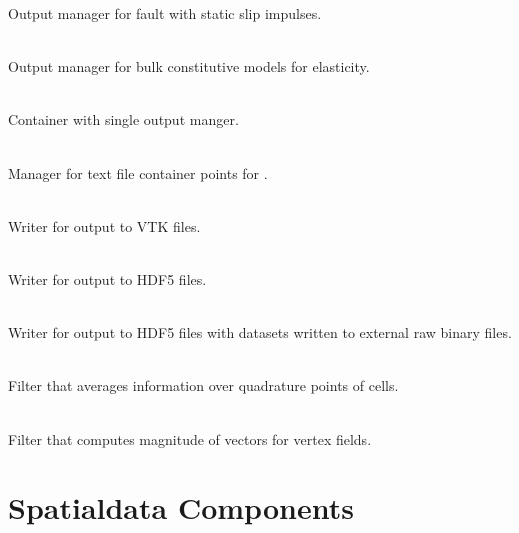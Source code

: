 \begin{description}
Output manager for fault with static slip impulses.
\item [\object{OutputMatElastic}] \\
Output manager for bulk constitutive models for elasticity.
\item [\object{SingleOutput}] \\
Container with single output manger.
\item [\object{PointsList}] \\
Manager for text file container points for .
\item [\object{DataWriterVTK}] \\
Writer for output to VTK files.
\item [\object{DataWriterHDF5}] \\
Writer for output to HDF5 files.
\item [\object{DataWriterHDF5Ext}] \\
Writer for output to HDF5 files with datasets written to external
raw binary files.
\item [\object{CellFilterAvg}] \\
Filter that averages information over quadrature points of cells.
\item [\object{VertexFilterVecNorm}] \\
Filter that computes magnitude of vectors for vertex fields.
\end{description}

\section{Spatialdata Components}


